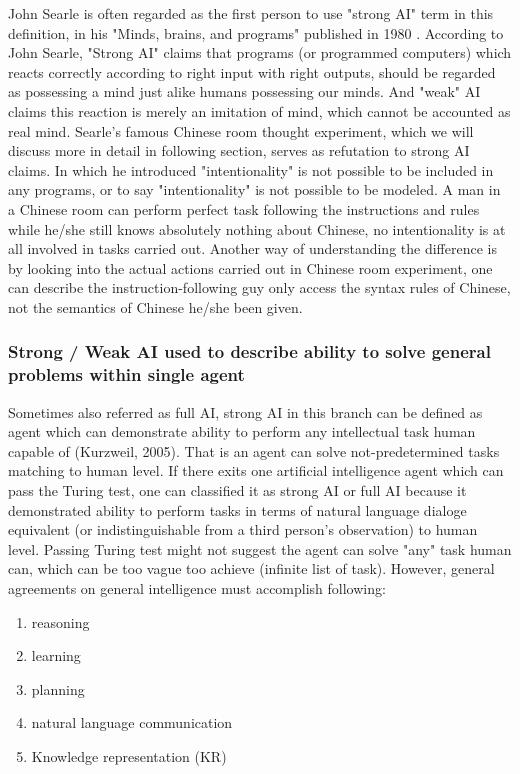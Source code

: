\documentclass[11pt]{article}
\begin{document}
John Searle is often regarded as the first person to use "strong AI" term in this definition, in his "Minds, brains, and programs" published in 1980 \cite{searle1980minds}. According to John Searle, "Strong AI" claims that programs (or programmed computers) which reacts correctly according to right input with right outputs, should be regarded as possessing a mind just alike humans possessing our minds. And "weak" AI claims this reaction is merely an imitation of mind, which cannot be accounted as real mind. Searle's famous Chinese room thought experiment, which we will discuss more in detail in following section, serves as refutation to strong AI claims. In which he introduced "intentionality" is not possible to be included in any programs, or to say "intentionality" is not possible to be modeled. A man in a Chinese room can perform perfect task following the instructions and rules while he/she still knows absolutely nothing about Chinese, no intentionality is at all involved in tasks carried out. Another way of understanding the difference is by looking into the actual actions carried out in Chinese room experiment, one can describe the instruction-following guy only access the syntax rules of Chinese, not the semantics of Chinese he/she been given.

\subsubsection{Strong / Weak AI used to describe ability to solve general problems within single agent}

Sometimes also referred as full AI, strong AI in this branch can be defined as agent which can demonstrate ability to perform any intellectual task human capable of (Kurzweil, 2005). That is an agent can solve not-predetermined tasks matching to human level. If there exits one artificial intelligence agent which can pass the Turing test, one can classified it as strong AI or full AI because it demonstrated ability to perform tasks in terms of natural language dialoge equivalent (or indistinguishable from a third person's observation) to human level. Passing Turing test might not suggest the agent can solve "any" task human can, which can be too vague too achieve (infinite list of task). However, general agreements on general intelligence must accomplish following:
\begin{enumerate}
\item reasoning
\item learning
\item planning
\item natural language communication
\item Knowledge representation (KR) 
\end{enumerate}
\end{document}
